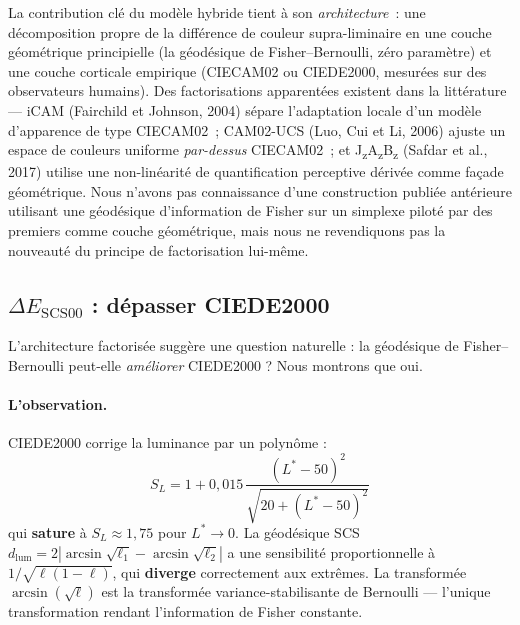 \documentclass[12pt,a4paper]{article}
\begin{document}
La contribution cl\'e du mod\`ele hybride tient \`a son
\emph{architecture}~: une d\'ecomposition propre de la diff\'erence de
couleur supra-liminaire en une couche g\'eom\'etrique principielle
(la g\'eod\'esique de Fisher--Bernoulli, z\'ero param\`etre) et une
couche corticale empirique (CIECAM02 ou CIEDE2000, mesur\'ees sur des
observateurs humains). Des factorisations apparent\'ees existent
dans la litt\'erature --- iCAM (Fairchild et Johnson, 2004) s\'epare
l'adaptation locale d'un mod\`ele d'apparence de type CIECAM02~;
CAM02-UCS (Luo, Cui et Li, 2006) ajuste un espace de couleurs uniforme
\emph{par-dessus} CIECAM02~; et
J\textsubscript{z}A\textsubscript{z}B\textsubscript{z}
(Safdar et al., 2017) utilise une non-lin\'earit\'e de quantification
perceptive d\'eriv\'ee comme fa\c{c}ade g\'eom\'etrique. Nous n'avons
pas connaissance d'une construction publi\'ee ant\'erieure utilisant
une g\'eod\'esique d'information de Fisher sur un simplexe pilot\'e
par des premiers comme couche g\'eom\'etrique, mais nous ne
revendiquons pas la nouveaut\'e du principe de factorisation
lui-m\^eme.

\subsection{$\Delta E_{\mathrm{SCS00}}$ : d\'epasser CIEDE2000}
\label{sec:sct00}

L'architecture factoris\'ee sugg\`ere une question naturelle : la
g\'eod\'esique de Fisher--Bernoulli peut-elle \emph{am\'eliorer}
CIEDE2000 ? Nous montrons que oui.

\paragraph{L'observation.}
CIEDE2000 corrige la luminance par un polyn\^ome :
\[
  S_L = 1 + 0{,}015\,\frac{(L^*-50)^2}{\sqrt{20+(L^*-50)^2}}
\]
qui \textbf{sature} \`a $S_L \approx 1{,}75$ pour $L^* \to 0$. La
g\'eod\'esique SCS $d_{\mathrm{lum}} = 2|\arcsin\sqrt{\ell_1} -
\arcsin\sqrt{\ell_2}|$ a une sensibilit\'e proportionnelle \`a
$1/\sqrt{\ell(1-\ell)}$, qui \textbf{diverge} correctement aux
extr\^emes. La transform\'ee $\arcsin(\sqrt{\ell})$ est la
transform\'ee variance-stabilisante de Bernoulli --- l'unique
transformation rendant l'information de Fisher constante.
\end{document}
